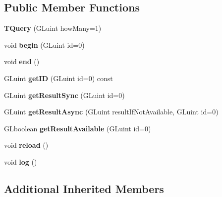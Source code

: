 \subsection*{Public Member Functions}
\begin{DoxyCompactItemize}
\item 
\mbox{\label{classflw_1_1flc_1_1TQuery_a2844cb4f9c0c3cd79a1b2031d39a0cb3}} 
{\bfseries T\+Query} (G\+Luint how\+Many=1)
\item 
\mbox{\label{classflw_1_1flc_1_1TQuery_a7525585ac205bd88a21134c31ea16db2}} 
void {\bfseries begin} (G\+Luint id=0)
\item 
\mbox{\label{classflw_1_1flc_1_1TQuery_abe2be94820765c6133c46b2f537a6109}} 
void {\bfseries end} ()
\item 
\mbox{\label{classflw_1_1flc_1_1TQuery_a86a4e74286d59f6b4046713f4d1f5e50}} 
G\+Luint {\bfseries get\+ID} (G\+Luint id=0) const
\item 
\mbox{\label{classflw_1_1flc_1_1TQuery_ac71e1fedd510f52d11fd19ab53bd2ab7}} 
G\+Luint {\bfseries get\+Result\+Sync} (G\+Luint id=0)
\item 
\mbox{\label{classflw_1_1flc_1_1TQuery_a476771526b027991b45d3459a6fb4bcc}} 
G\+Luint {\bfseries get\+Result\+Async} (G\+Luint result\+If\+Not\+Available, G\+Luint id=0)
\item 
\mbox{\label{classflw_1_1flc_1_1TQuery_aad811849ae8d5af1a871bfbb8ddf6f0d}} 
G\+Lboolean {\bfseries get\+Result\+Available} (G\+Luint id=0)
\item 
\mbox{\label{classflw_1_1flc_1_1TQuery_ac76abc32cda4f70f4b8e97f418b87cd3}} 
void {\bfseries reload} ()
\item 
\mbox{\label{classflw_1_1flc_1_1TQuery_aacf97c5ed0e67321a32723fe5fdd443d}} 
void {\bfseries log} ()
\end{DoxyCompactItemize}
\subsection*{Additional Inherited Members}


